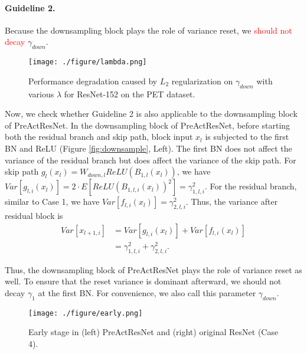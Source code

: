 \documentclass{article}
\begin{document}
\paragraph{Guideline 2.}Because the downsampling block plays the role of variance reset, we \textcolor{red}{should not decay} $\gamma_{down}$.

\begin{wrapfigure}{r}{0.26\textwidth}
    \centering
\texttt{[image: ./figure/lambda.png]}
    \caption{Performance degradation caused by $L_2$ regularization on $\gamma_{down}$ with various $\lambda$ for ResNet-152 on the PET dataset.}
    \label{fig:lambda}
\end{wrapfigure}
Now, we check whether Guideline 2 is also applicable to the downsampling block of PreActResNet. In the downsampling block of PreActResNet, before starting both the residual branch and skip path, block input $x_l$ is subjected to the first BN and ReLU (Figure \ref{fig:downsample}, Left). The first BN does not affect the variance of the residual branch but does affect the variance of the skip path. For skip path $g_l(x_l) = W_{down,l} ReLU(B_{1,l}(x_l))$, we have $Var[g_{l,i}(x_l)] = 2 \cdot E[ReLU(B_{1,l,i}(x_l))^2] = \gamma_{1,l,i}^2$. For the residual branch, similar to Case 1, we have $Var[f_{l,i}(x_l)] = \gamma_{2,l,i}^2$. Thus, the variance after residual block is
\begin{align}
	Var[x_{l+1,i}] & = Var[g_{l,i}(x_l)] + Var[f_{l,i}(x_l)] \\
	               & = \gamma_{1,l,i}^2 + \gamma_{2,l,i}^2.
\end{align}

Thus, the downsampling block of PreActResNet plays the role of variance reset as well. To ensure that the reset variance is dominant afterward, we should not decay $\gamma_1$ at the first BN. For convenience, we also call this parameter $\gamma_{down}$.

\begin{figure}[t!]
	\centering
\texttt{[image: ./figure/early.png]}
    \caption{Early stage in (left) PreActResNet and (right) original ResNet (Case 4).}
	\label{fig:early}
\end{figure}
\end{document}
